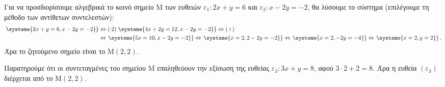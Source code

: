 \begin{alist}
\item Για να προσδιορίσουμε αλγεβρικά το κοινό σημείο $\text{M}$ των ευθειών $\varepsilon_1: 2x + y = 6$ και $\varepsilon_2: x - 2y = -2$, θα λύσουμε το σύστημα (επιλέγουμε τη μέθοδο των αντίθετων συντελεστών):
\begin{align*}
\left.\systeme{2x + y = 6, x - 2y = -2}\right\} &\Leftrightarrow{(\cdot 2)} \left.\systeme{4x + 2y = 12, x - 2y = -2}\right\} \Leftrightarrow{(+)}\\&\Leftrightarrow \left.\systeme{5x = 10, x - 2y = -2}\right\} \Leftrightarrow \left.\systeme{x = 2, 2 - 2y = -2}\right\} \Leftrightarrow \left.\systeme{x = 2, -2y = -4}\right\} \Leftrightarrow \left.\systeme{x = 2, y = 2}\right\}.
\end{align*}
Άρα το ζητούμενο σημείο είναι το $\text{M}(2, 2)$.
\item Παρατηρούμε ότι οι συντεταγμένες του σημείου $\text{M}$ επαληθεύουν την εξίσωση της ευθείας $\varepsilon_3: 3x + y = 8$, αφού $3 \cdot 2 + 2 = 8$. Άρα η ευθεία $(\varepsilon_3)$ διέρχεται από το $\text{M}(2, 2)$.
\end{alist}


